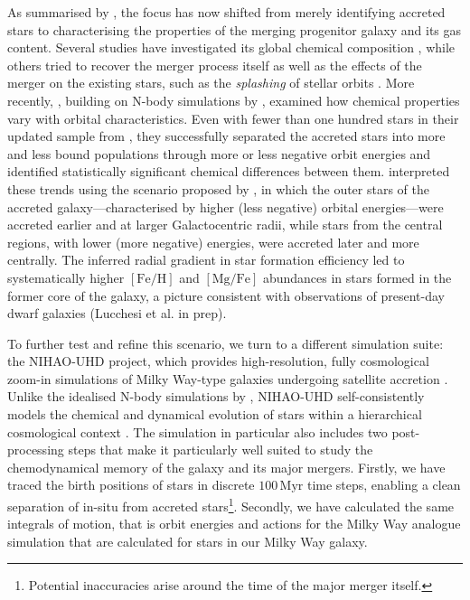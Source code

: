 \documentclass[fleqn,usenatbib]{mnras}
\begin{document}
As summarised by \citet{Helmi2020}, the focus has now shifted from merely identifying accreted stars to characterising the properties of the merging progenitor galaxy and its gas content. Several studies have investigated its global chemical composition \citep[for example][]{Das2020, Feuillet2021, Aguado2021, Matsuno2021, Buder2022, Belokurov2022, DeSilva2023, Monty2024, Ou2024}, while others tried to recover the merger process itself \citep[for example][]{Naidu2021} as well as the effects of the merger on the existing stars, such as the \textit{splashing} of stellar orbits \citep{Belokurov2020, Belokurov2022}. More recently, \citet{Skuladottir2025}, building on N-body simulations by \citet{Mori2024}, examined how chemical properties vary with orbital characteristics. Even with fewer than one hundred stars in their updated sample from \citet{Nissen2010, Nissen2024}, they successfully separated the accreted stars into more and less bound populations through more or less negative orbit energies and identified statistically significant chemical differences between them. \citet{Skuladottir2025} interpreted these trends using the scenario proposed by \citet{Mori2024}, in which the outer stars of the accreted galaxy—characterised by higher (less negative) orbital energies—were accreted earlier and at larger Galactocentric radii, while stars from the central regions, with lower (more negative) energies, were accreted later and more centrally. The inferred radial gradient in star formation efficiency led to systematically higher $\mathrm{[Fe/H]}$ and $\mathrm{[Mg/Fe]}$ abundances in stars formed in the former core of the galaxy, a picture consistent with observations of present-day dwarf galaxies (Lucchesi et al. in prep).

To further test and refine this scenario, we turn to a different simulation suite: the NIHAO-UHD project, which provides high-resolution, fully cosmological zoom-in simulations of Milky Way-type galaxies undergoing satellite accretion \citep{Buck2020, Buck2020b, Buck2021}. Unlike the idealised N-body simulations by \citet{Mori2024}, NIHAO-UHD self-consistently models the chemical and dynamical evolution of stars within a hierarchical cosmological context \citep{Buck2021}. 
The simulation in particular also includes two post-processing steps that make it particularly well suited to study the chemodynamical memory of the galaxy and its major mergers. Firstly, we have traced the birth positions of stars in discrete $100\,\mathrm{Myr}$ time steps, enabling a clean separation of in-situ from accreted stars\footnote{Potential inaccuracies arise around the time of the major merger itself.}. Secondly, we have calculated the same integrals of motion, that is orbit energies and actions for the Milky Way analogue simulation that are calculated for stars in our Milky Way galaxy.
\end{document}
